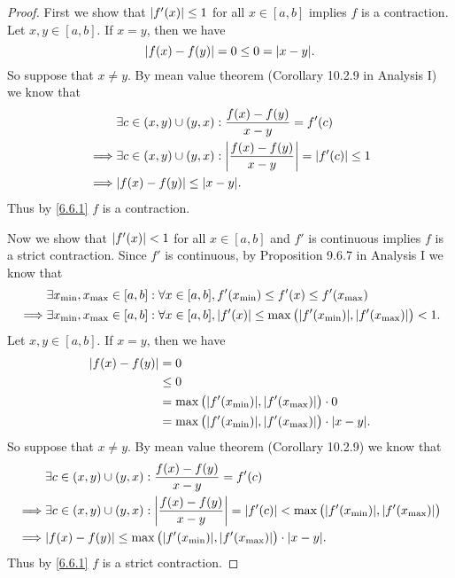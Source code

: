 \begin{proof}
  First we show that \(\left\lvert f'(x)\right\rvert \leq 1\) for all \(x \in [a, b]\) implies \(f\) is a contraction.
  Let \(x, y \in [a, b]\).
  If \(x = y\), then we have
  \[
    \abs{f(x) - f(y)} = 0 \leq 0 = \abs{x - y}.
  \]
  So suppose that \(x \neq y\).
  By mean value theorem (Corollary 10.2.9 in Analysis I) we know that
  \begin{align*}
             & \exists c \in (x, y) \cup (y, x) : \dfrac{f(x) - f(y)}{x - y} = f'(c)                    \\
    \implies & \exists c \in (x, y) \cup (y, x) : \abs{\dfrac{f(x) - f(y)}{x - y}} = \abs{f'(c)} \leq 1 \\
    \implies & \abs{f(x) - f(y)} \leq \abs{x - y}.
  \end{align*}
  Thus by \cref{6.6.1} \(f\) is a contraction.

  Now we show that \(\left\lvert f'(x)\right\rvert < 1\) for all \(x \in [a, b]\) and \(f'\) is continuous implies \(f\) is a strict contraction.
  Since \(f'\) is continuous, by Proposition 9.6.7 in Analysis I we know that
  \begin{align*}
             & \exists x_{\min}, x_{\max} \in [a, b] : \forall x \in [a, b], f'(x_{\min}) \leq f'(x) \leq f'(x_{\max})                                  \\
    \implies & \exists x_{\min}, x_{\max} \in [a, b] : \forall x \in [a, b], \abs{f'(x)} \leq \max\big(\abs{f'(x_{\min})}, \abs{f'(x_{\max})}\big) < 1.
  \end{align*}
  Let \(x, y \in [a, b]\).
  If \(x = y\), then we have
  \begin{align*}
    \abs{f(x) - f(y)} & = 0                                                                       \\
                      & \leq 0                                                                    \\
                      & = \max\big(\abs{f'(x_{\min})}, \abs{f'(x_{\max})}\big) \cdot 0            \\
                      & = \max\big(\abs{f'(x_{\min})}, \abs{f'(x_{\max})}\big) \cdot \abs{x - y}.
  \end{align*}
  So suppose that \(x \neq y\).
  By mean value theorem (Corollary 10.2.9) we know that
  \begin{align*}
             & \exists c \in (x, y) \cup (y, x) : \dfrac{f(x) - f(y)}{x - y} = f'(c)                                                                    \\
    \implies & \exists c \in (x, y) \cup (y, x) : \abs{\dfrac{f(x) - f(y)}{x - y}} = \abs{f'(c)} < \max\big(\abs{f'(x_{\min})}, \abs{f'(x_{\max})}\big) \\
    \implies & \abs{f(x) - f(y)} \leq \max\big(\abs{f'(x_{\min})}, \abs{f'(x_{\max})}\big) \cdot \abs{x - y}.
  \end{align*}
  Thus by \cref{6.6.1} \(f\) is a strict contraction.
\end{proof}

